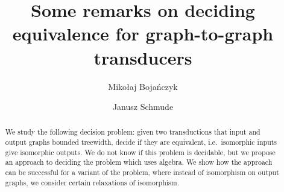 \documentclass[a4paper,english]{lipics-v2019}
\title{Some remarks on deciding equivalence for graph-to-graph transducers}
\author{Miko\l aj Boja\' nczyk}{Institute of Informatics,\\ University of
Warsaw, Poland}{bojan@mimuw.edu.pl}{}{}
\author{Janusz Schmude}{Institute of Informatics,\\ University of
Warsaw, Poland}{jschmude@mimuw.edu.pl}{}{}
\begin{document}



\maketitle

\begin{abstract}
    We  study the following decision problem: given two \mso transductions that input and output graphs bounded treewidth, decide if they are equivalent, i.e.~isomorphic inputs give isomorphic outputs. We do not know  if this problem is decidable, but  we  propose an approach to deciding the problem which uses algebra. We  show how the approach can be successful for a variant of the problem, where instead of isomorphism on output graphs, we consider certain relaxations of isomorphism.
\end{abstract}

% 



\end{document}
